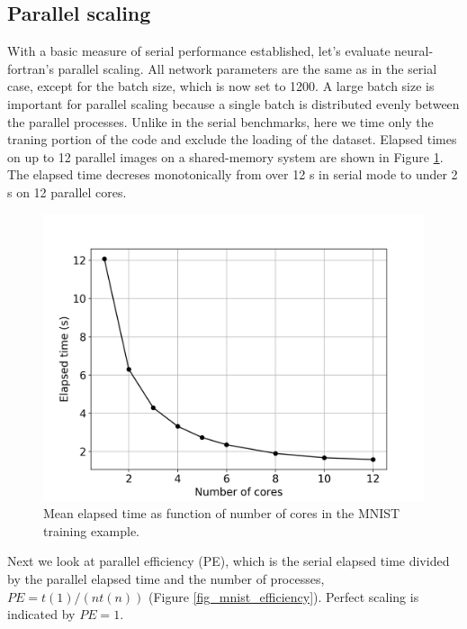 \documentclass[sigplan, review=false, screen=true, balance=true]{acmart}
\begin{document}
\subsection{Parallel scaling}

With a basic measure of serial performance established, let's evaluate
neural-fortran's parallel scaling. All network parameters are the same as in
the serial case, except for the batch size, which is now set to 1200.
A large batch size is important for parallel scaling because a single batch is
distributed evenly between the parallel processes.
Unlike in the serial benchmarks, here we time only the traning portion
of the code and exclude the loading of the dataset. Elapsed times on up to
12 parallel images on a shared-memory system are shown in Figure
\ref{fig_mnist_elapsed}. The elapsed time decreses monotonically from over
12 s in serial mode to under 2 s on 12 parallel cores.

\begin{figure}[H]
  \centering
  \includegraphics[width=\columnwidth]{../figures/nf-parallel-elapsed.png}
  \caption{Mean elapsed time as function of number of cores in the MNIST training example.}
  \label{fig_mnist_elapsed}
\end{figure}

Next we look at parallel efficiency (PE), which is the serial elapsed time
divided by the parallel elapsed time and the number of processes,
$PE = t(1) / (n t(n))$ (Figure \ref{fig_mnist_efficiency}).
Perfect scaling is indicated by $PE = 1$.
\end{document}
